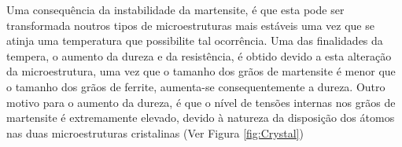 \par
Uma consequência da instabilidade da martensite, é que esta pode ser transformada noutros tipos de microestruturas mais estáveis uma vez que se atinja uma temperatura que possibilite tal ocorrência. Uma das finalidades da tempera, o aumento da dureza e da resistência, é obtido devido a esta alteração da microestrutura, uma vez que o tamanho dos grãos de martensite é menor que o tamanho dos grãos de ferrite, aumenta-se consequentemente a dureza\cite{Krauss2015}. Outro motivo para o aumento da dureza, é que o nível de tensões internas nos grãos de martensite é extremamente elevado, devido à natureza da disposição dos átomos nas duas microestruturas cristalinas (Ver Figura \ref{fig:Crystal})

